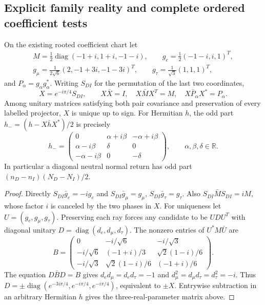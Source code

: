 \documentclass[11pt,a4paper]{article}
\begin{document}
\subsection{Explicit family reality and complete ordered coefficient tests}
\begin{theorem}
\label{p5c:thm:v2217-family-reality-ordered-tests}
On the existing rooted coefficient chart let
\[
 \begin{gathered}
 M=\tfrac12\operatorname{diag}(-1+i,1+i,-1-i),\qquad
 g_e=\tfrac12(-1-i,i,1)^T,\\
 g_\mu=\tfrac1{2\sqrt6}(2,-1+3i,-1-3i)^T,\qquad
 g_\tau=\tfrac1{\sqrt3}(1,1,1)^T,
 \end{gathered}
\]
and $P_\alpha=g_\alpha g_\alpha^*$.
Writing $S_{DI}$ for the permutation of the last two coordinates,
\[
 X=e^{-i\pi/4}S_{DI},\qquad
 X\bar X=I,\quad X\bar M X^T=M,\quad X\bar P_\alpha X^*=P_\alpha.
\]
Among unitary matrices satisfying both pair covariance and preservation
of every labelled projector, $X$ is unique up to sign. For Hermitian $h$,
the odd part $h_-=(h-X\bar hX^*)/2$ is precisely
\[
 h_-=\begin{pmatrix}
 0&\alpha+i\beta&-\alpha+i\beta\\
 \alpha-i\beta&\delta&0\\-\alpha-i\beta&0&-\delta
 \end{pmatrix},\qquad \alpha,\beta,\delta\in\mathbb R.
\]
In particular a diagonal neutral normal return has odd part
$(n_D-n_I)(N_D-N_I)/2$.
\end{theorem}
\begin{proof}
Directly $S_{DI}\bar g_e=-ig_e$ and
$S_{DI}\bar g_\mu=g_\mu$, $S_{DI}\bar g_\tau=g_\tau$.
Also $S_{DI}\bar M S_{DI}=iM$, whose factor $i$ is canceled by
the two phases in $X$. For uniqueness let $U=(g_e,g_\mu,g_\tau)$.
Preserving each ray forces any candidate to be $UDU^T$ with diagonal
unitary $D=\operatorname{diag}(d_e,d_\mu,d_\tau)$. The nonzero entries of
$U^*M\bar U$ are
\[
 B=\begin{pmatrix}
 0&-i/\sqrt6&-i/\sqrt3\\
 -i/\sqrt6&(-1+i)/3&\sqrt2(1-i)/6\\
 -i/\sqrt3&\sqrt2(1-i)/6&(-1+i)/6
 \end{pmatrix}.
\]
The equation $D\bar BD=B$ gives $d_ed_\mu=d_ed_\tau=-1$ and
$d_\mu^2=d_\mu d_\tau=d_\tau^2=-i$. Thus
$D=\pm\operatorname{diag}(e^{-3i\pi/4},e^{-i\pi/4},e^{-i\pi/4})$,
equivalent to $\pm X$. Entrywise subtraction in an arbitrary Hermitian
$h$ gives the three-real-parameter matrix above.
\end{proof}
\end{document}
